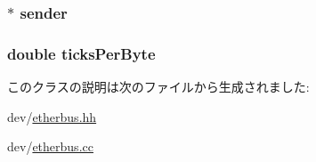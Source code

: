 \label{classEtherBus_a8bd0d3f7eb9e8d7189c7027028a5fac0}
\hypertarget{classEtherBus_a748042e0d79456e5d2ec45a85392b06c}{
\subsubsection[{sender}]{$\ast$ {\bf sender}}}
\label{classEtherBus_a748042e0d79456e5d2ec45a85392b06c}
\hypertarget{classEtherBus_ab03ddf4a7f12da61f07e2e0c644ef06c}{
\subsubsection[{ticksPerByte}]{\setlength{\rightskip}{0pt plus 5cm}double {\bf ticksPerByte}}}
\label{classEtherBus_ab03ddf4a7f12da61f07e2e0c644ef06c}


このクラスの説明は次のファイルから生成されました:\begin{DoxyCompactItemize}
\item 
dev/\hyperlink{etherbus_8hh}{etherbus.hh}\item 
dev/\hyperlink{etherbus_8cc}{etherbus.cc}\end{DoxyCompactItemize}
